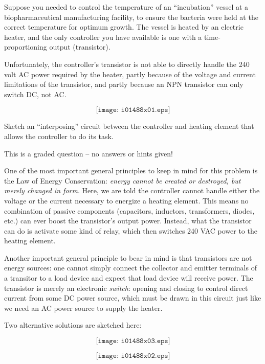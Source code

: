 

Suppose you needed to control the temperature of an ``incubation'' vessel at a biopharmaceutical manufacturing facility, to ensure the bacteria were held at the correct temperature for optimum growth.  The vessel is heated by an electric heater, and the only controller you have available is one with a time-proportioning output (transistor).

Unfortunately, the controller's transistor is not able to directly handle the 240 volt AC power required by the heater, partly because of the voltage and current limitations of the transistor, and partly because an NPN transistor can only switch DC, not AC.

\vskip 50pt

$$\texttt{[image: i01488x01.eps]}$$

\vskip 50pt

Sketch an ``interposing'' circuit between the controller and heating element that allows the controller to do its task.

\vfil 

\eject






This is a graded question -- no answers or hints given!







One of the most important general principles to keep in mind for this problem is the Law of Energy Conservation: {\it energy cannot be created or destroyed, but merely changed in form}.  Here, we are told the controller cannot handle either the voltage or the current necessary to energize a heating element.  This means no combination of passive components (capacitors, inductors, transformers, diodes, etc.) can ever boost the transistor's output power.  Instead, what the transistor can do is activate some kind of relay, which then switches 240 VAC power to the heating element.

Another important general principle to bear in mind is that transistors are not energy sources: one cannot simply connect the collector and emitter terminals of a transitor to a load device and expect that load device will receive power.  The transistor is merely an electronic {\it switch}: opening and closing to control direct current from some DC power source, which must be drawn in this circuit just like we need an AC power source to supply the heater.

Two alternative solutions are sketched here:

$$\texttt{[image: i01488x03.eps]}$$

$$\texttt{[image: i01488x02.eps]}$$




